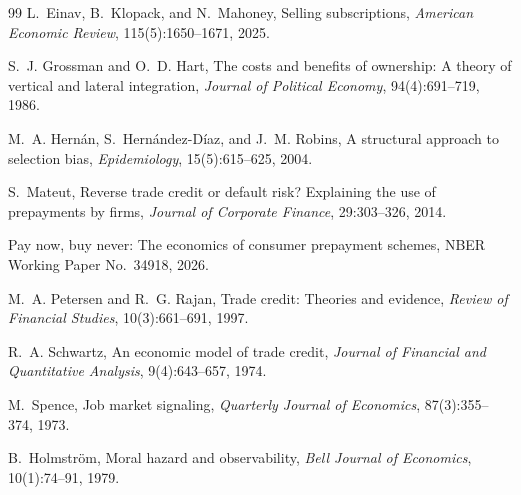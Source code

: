 \begin{thebibliography}{99}
L.~Einav, B.~Klopack, and N.~Mahoney,
\newblock Selling subscriptions,
\newblock \emph{American Economic Review}, 115(5):1650--1671, 2025.

S.~J. Grossman and O.~D. Hart,
\newblock The costs and benefits of ownership: A theory of vertical and lateral integration,
\newblock \emph{Journal of Political Economy}, 94(4):691--719, 1986.

M.~A. Hern\'an, S.~Hern\'andez-D\'iaz, and J.~M. Robins,
\newblock A structural approach to selection bias,
\newblock \emph{Epidemiology}, 15(5):615--625, 2004.

S.~Mateut,
\newblock Reverse trade credit or default risk? Explaining the use of prepayments by firms,
\newblock \emph{Journal of Corporate Finance}, 29:303--326, 2014.

Pay now, buy never: The economics of consumer prepayment schemes,
\newblock NBER Working Paper No.~34918, 2026.

M.~A. Petersen and R.~G. Rajan,
\newblock Trade credit: Theories and evidence,
\newblock \emph{Review of Financial Studies}, 10(3):661--691, 1997.

R.~A. Schwartz,
\newblock An economic model of trade credit,
\newblock \emph{Journal of Financial and Quantitative Analysis}, 9(4):643--657, 1974.

M.~Spence,
\newblock Job market signaling,
\newblock \emph{Quarterly Journal of Economics}, 87(3):355--374, 1973.

B.~Holmstr\"om,
\newblock Moral hazard and observability,
\newblock \emph{Bell Journal of Economics}, 10(1):74--91, 1979.


\end{thebibliography}

